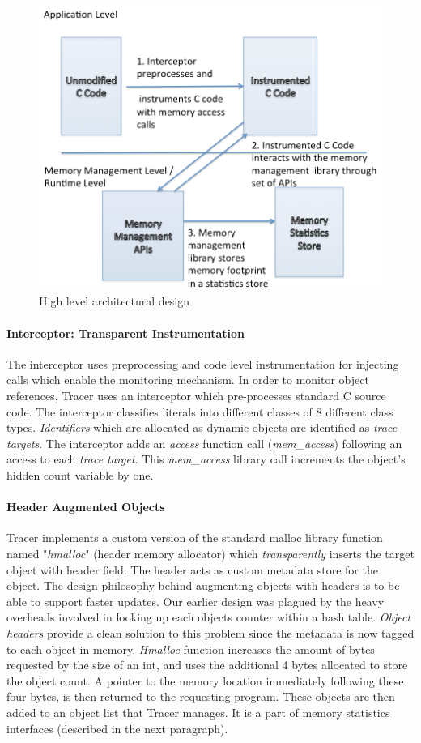 \begin{figure}[!ht]
\caption{High level architectural design}
\label{fig:architecture}
\includegraphics[scale=0.3]{./images/architecture.png}
\end{figure}

\paragraph{Interceptor: Transparent Instrumentation}
The interceptor uses preprocessing and code level instrumentation for injecting calls which enable the monitoring mechanism. In order to monitor object references, Tracer uses an interceptor which pre-processes standard C source code. The interceptor classifies literals into different classes of 8 different class types. {\emph{Identifiers}} which are allocated as dynamic objects are identified as {\emph{trace targets}}.  The interceptor adds an {\emph{access}} function call ({\emph{mem\_access}}) following an access to each {\emph{trace target}}. This {\emph{mem\_access}} library call increments the object's hidden count variable by one. 
\paragraph{Header Augmented Objects}
Tracer implements a custom version of the standard malloc library function named "{\emph{hmalloc}}" (header memory allocator) which {\emph{transparently}} inserts the target object with header field. The header acts as custom metadata store for the object. The design philosophy behind augmenting objects with headers is to be able to support faster updates. Our earlier design was plagued by the heavy overheads involved in looking up each objects counter within a hash table. {\emph{Object headers}} provide a clean solution to this problem since the metadata is now tagged to each object in memory. {\emph{Hmalloc}} function increases the amount of bytes requested by the size of an int, and uses the additional 4 bytes allocated to store the object count. A pointer to the memory location immediately following these four bytes, is then returned to the requesting program. These objects are then added to an object list that Tracer manages. It is a part of memory statistics interfaces (described in the next paragraph).
